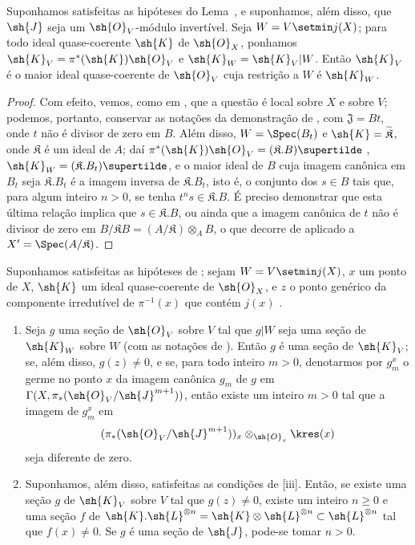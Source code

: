 \documentclass[oneside,10pt]{amsart}
\renewcommand{\geq}{\geqslant}
\newcommand{\oldpage}[2][]{\marginnote{\normalfont\footnotesize\textbf{#1}~|~#2}\ignorespaces}
\let\EGAOriginalLabel\label
\renewcommand{\label}[1]{\phantomsection\EGAOriginalLabel{#1}}
\begin{document}
\begin{corollary}[8.10.4]
\label{II.8.10.4}
Suponhamos satisfeitas as hipóteses do Lema~, e suponhamos, além disso, que $\sh{J}$ seja um $\sh{O}_V$-módulo invertível.
Seja $W=V\setmin j(X)$;
para todo ideal quase-coerente $\sh{K}$ de $\sh{O}_X$, ponhamos $\sh{K}_V=\pi^*(\sh{K})\sh{O}_V$ e $\sh{K}_W=\sh{K}_V|W$.
Então $\sh{K}_V$ é o maior ideal quase-coerente de $\sh{O}_V$ cuja restrição a $W$ é $\sh{K}_W$.
\end{corollary}

\begin{proof}
Com efeito, vemos, como em , que a questão é local sobre $X$ e sobre $V$;
podemos, portanto, conservar as notações da demonstração de , com $\mathfrak{J}=Bt$, onde $t$ não é divisor de zero em $B$.
Além disso, $W=\Spec(B_t)$ e $\sh{K}=\widetilde{\mathfrak{K}}$, onde $\mathfrak{K}$ é um ideal de $A$;
daí $\pi^*(\sh{K})\sh{O}_V=(\mathfrak{K}.B)\supertilde$ , $\sh{K}_W=(\mathfrak{K}.B_t)\supertilde$, e o maior ideal
\oldpage[II]{187}
de $B$ cuja imagem canônica em $B_t$ seja $\mathfrak{K}.B_t$ é a imagem inversa de $\mathfrak{K}.B_t$, isto é, o conjunto dos $s\in B$ tais que, para algum inteiro $n>0$, se tenha $t^ns\in\mathfrak{K}.B$.
É preciso demonstrar que esta última relação implica que $s\in\mathfrak{K}.B$, ou ainda que a imagem canônica de $t$ não é divisor de zero em $B/\mathfrak{K}B=(A/\mathfrak{K})\otimes_A B$, o que decorre de  aplicado a $X'=\Spec(A/\mathfrak{K})$.
\end{proof}

\begin{corollary}[8.10.5]
\label{II.8.10.5}
Suponhamos satisfeitas as hipóteses de ;
sejam $W=V\setmin j(X)$, $x$ um ponto de $X$, $\sh{K}$ um ideal quase-coerente de $\sh{O}_X$, e $z$ o ponto genérico da componente irredutível de $\pi^{-1}(x)$ que contém $j(x)$ .
\begin{enumerate}
    \item[\rm{(i)}] Seja $g$ uma seção de $\sh{O}_V$ sobre $V$ tal que $g|W$ seja uma seção de $\sh{K}_W$ sobre $W$ (com as notações de ).
        Então $g$ é uma seção de $\sh{K}_V$;
        se, além disso, $g(z)\neq0$, e se, para todo inteiro $m>0$, denotarmos por $g_m^x$ o germe no ponto $x$ da imagem canônica $g_m$ de $g$ em $\Gamma(X,\pi_*(\sh{O}_V/\sh{J}^{m+1}))$, então existe um inteiro $m>0$ tal que a imagem de $g_m^x$ em
        \[
            (\pi_*(\sh{O}_V/\sh{J}^{m+1}))_x \otimes_{\sh{O}_x} \kres(x)
        \]
        seja diferente de zero.
    \item[\rm{(ii)}] Suponhamos, além disso, satisfeitas as condições de [iii].
        Então, se existe uma seção $g$ de $\sh{K}_V$ sobre $V$ tal que $g(z)\neq0$, existe um inteiro $n\geq0$ e uma seção $f$ de $\sh{K}.\sh{L}^{\otimes n}=\sh{K}\otimes\sh{L}^{\otimes n}\subset\sh{L}^{\otimes n}$ tal que $f(x)\neq0$.
        Se $g$ é uma seção de $\sh{J}$, pode-se tomar $n>0$.
\end{enumerate}
\end{corollary}
\end{document}

